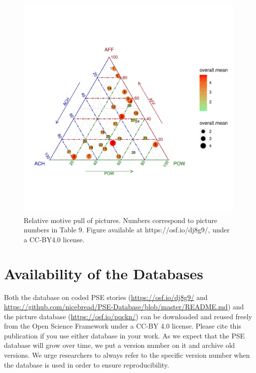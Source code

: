 \documentclass[man,a4paper,mask]{apa6}\usepackage[]{graphicx}\usepackage[]{color}
\newenvironment{knitrout}{}{} %
\begin{document}
\begin{knitrout}
\color{fgcolor}\begin{figure}

{\centering \includegraphics[width=.9\textwidth]{figure/ternary-1} 

}

\caption[Relative motive pull of pictures]{Relative motive pull of pictures. Numbers correspond to picture numbers in Table 9. Figure available at https://osf.io/dj8g9/, under a CC-BY4.0 license.}\label{fig:ternary}
\end{figure}


\end{knitrout}

\section{Availability of the Databases}

Both the database on coded PSE stories (\url{https://osf.io/dj8g9/} and \url{https://github.com/nicebread/PSE-Database/blob/master/README.md}) and the picture database (\url{https://osf.io/pqckn/}) can be downloaded and reused freely from the Open Science Framework under a CC-BY 4.0 license. Please cite this publication if you use either database in your work.
As we expect that the PSE database will grow over time, we put a version number on it and archive old versions. We urge researchers to always refer to the specific version number when the database is used in order to ensure reproducibility.
\end{document}
